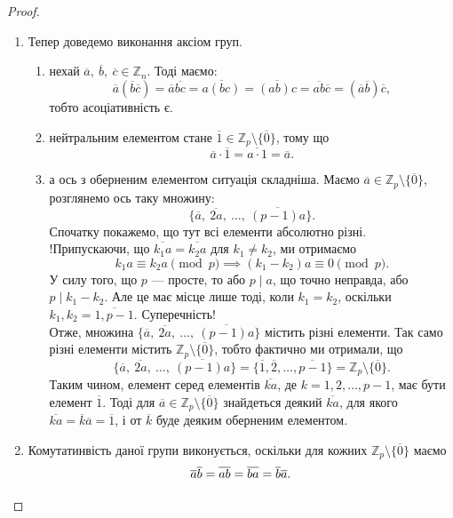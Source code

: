 \documentclass{math_library}
\begin{document}
\begin{proof}
\begin{enumerate}[topsep=0pt,wide=0pt,label={\Roman*.}]
\begin{enumerate}[nosep,wide=0pt,label={\roman*.}]
\item Тепер доведемо виконання аксіом груп.
\begin{enumerate}[nosep,label={\arabic*)}]
\item нехай $\overline{a},\ \overline{b},\ \overline{c} \in \mathbb{Z}_n$. Тоді маємо: 
\[
\overline{a}(\overline{b}\overline{c}) = \overline{a}\overline{bc} = \overline{a(bc)} = \overline{(ab)c} = \overline{ab} \overline{c} = (\overline{a}\overline{b})\overline{c},
\]
тобто асоціативність є.
\item нейтральним елементом стане $\overline{1} \in \mathbb{Z}_p \setminus \{ \overline{0}\}$, тому що
\[ 
\overline{a} \cdot \overline{1} = \overline{a \cdot 1} = \overline{a}.
\]
\item а ось з оберненим елементом ситуація складніша. Маємо $\overline{a} \in \mathbb{Z}_p \setminus \{ \overline{0}\}$, розглянемо ось таку множину: 
\[ 
\{\overline{a},\ \overline{2a},\ \dots,\ \overline{(p-1)a} \}. 
\]
Спочатку покажемо, що тут всі елементи абсолютно різні. \\
!Припускаючи, що $\overline{k_1 a} = \overline{k_2 a}$ для $k_1 \neq k_2$, ми отримаємо 
\[ 
k_1 a \equiv k_2 a \pmod p \implies (k_1-k_2)a \equiv 0 \pmod p.
\] 
У силу того, що $p$ --- просте, то або $p \mid a$, що точно неправда, або $p \mid k_1-k_2$. Але це має місце лише тоді, коли $k_1 = k_2$, оскільки $k_1,k_2 = \overline{1,p-1}$. Суперечність!\\
Отже, множина $\{\overline{a},\ \overline{2a},\ \dots,\ \overline{(p-1)a} \}$ містить різні елементи. Так само різні елементи містить $\mathbb{Z}_p \setminus \{ \overline{0}\}$, тобто фактично ми отримали, що 
\[
\{\overline{a},\ \overline{2a},\ \dots,\ \overline{(p-1)a} \} = \{ \overline{1}, \overline{2}, \dots, \overline{p-1} \} = \mathbb{Z}_p \setminus \{ \overline{0}\}.
\]
Таким чином, елемент серед елементів $\overline{ka}$, де $k = 1,2,\dots,p-1$, має бути елемент $\overline{1}$. Тоді для $\overline{a} \in \mathbb{Z}_p \setminus \{ \overline{0}\}$ знайдеться деякий $\overline{ka}$, для якого $\overline{ka} = \overline{k} \overline{a} = \overline{1}$, і от $\overline{k}$ буде деяким оберненим елементом.
\end{enumerate}

\item Комутатинвість даної групи виконується, оскільки для кожних $\mathbb{Z}_p \setminus \{ \overline{0}\}$ маємо
\[
\overline{a} \overline{b} = \overline{ab} = \overline{ba} = \overline{b} \overline{a}. \qedhere
\]
\end{enumerate}
\end{enumerate}
\end{proof}
\end{document}
